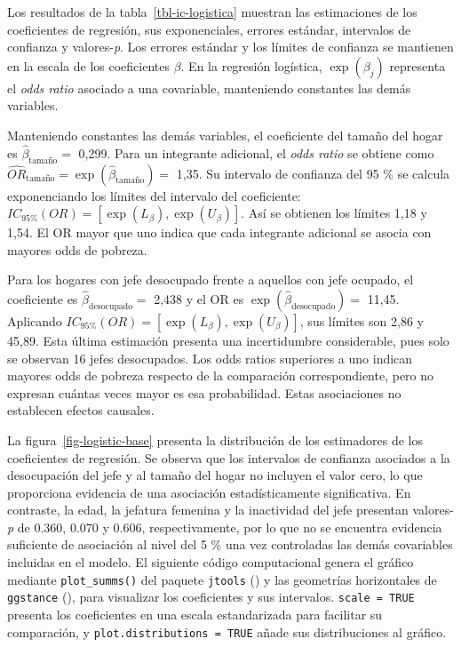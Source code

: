 \documentclass[
  spanish,
  11pt,
  letterpaper,
  oneside,
  open=any]{scrbook}
\begin{document}
Los resultados de la tabla~\ref{tbl-ic-logistica} muestran las
estimaciones de los coeficientes de regresión, sus exponenciales,
errores estándar, intervalos de confianza y valores-\emph{p}. Los
errores estándar y los límites de confianza se mantienen en la escala de
los coeficientes \(\beta\). En la regresión logística, \(\exp(\beta_j)\)
representa el \emph{odds ratio} asociado a una covariable, manteniendo
constantes las demás variables.

Manteniendo constantes las demás variables, el coeficiente del tamaño
del hogar es \(\hat\beta_{\mathrm{tamaño}}=\) 0,299. Para un integrante
adicional, el \emph{odds ratio} se obtiene como
\(\widehat{OR}_{\mathrm{tamaño}}=\exp(\hat\beta_{\mathrm{tamaño}})=\)
1,35. Su intervalo de confianza del 95 \% se calcula exponenciando los
límites del intervalo del coeficiente:
\(IC_{95\%}(OR)=[\exp(L_\beta),\exp(U_\beta)]\). Así se obtienen los
límites 1,18 y 1,54. El OR mayor que uno indica que cada integrante
adicional se asocia con mayores odds de pobreza.

Para los hogares con jefe desocupado frente a aquellos con jefe ocupado,
el coeficiente es \(\hat\beta_{\mathrm{desocupado}}=\) 2,438 y el OR es
\(\exp(\hat\beta_{\mathrm{desocupado}})=\) 11,45. Aplicando
\(IC_{95\%}(OR)=[\exp(L_\beta),\exp(U_\beta)]\), sus límites son 2,86 y
45,89. Esta última estimación presenta una incertidumbre considerable,
pues solo se observan 16 jefes desocupados. Los odds ratios superiores a
uno indican mayores odds de pobreza respecto de la comparación
correspondiente, pero no expresan cuántas veces mayor es esa
probabilidad. Estas asociaciones no establecen efectos causales.

La figura~\ref{fig-logistic-base} presenta la distribución de los
estimadores de los coeficientes de regresión. Se observa que los
intervalos de confianza asociados a la desocupación del jefe y al tamaño
del hogar no incluyen el valor cero, lo que proporciona evidencia de una
asociación estadísticamente significativa. En contraste, la edad, la
jefatura femenina y la inactividad del jefe presentan valores-\emph{p}
de 0.360, 0.070 y 0.606, respectivamente, por lo que no se encuentra
evidencia suficiente de asociación al nivel del 5 \% una vez controladas
las demás covariables incluidas en el modelo. El siguiente código
computacional genera el gráfico mediante \texttt{plot\_summs()} del
paquete \texttt{jtools} () y las
geometrías horizontales de \texttt{ggstance}
(), para visualizar los
coeficientes y sus intervalos. \texttt{scale\ =\ TRUE} presenta los
coeficientes en una escala estandarizada para facilitar su comparación,
y \texttt{plot.distributions\ =\ TRUE} añade sus distribuciones al
gráfico.
\end{document}
